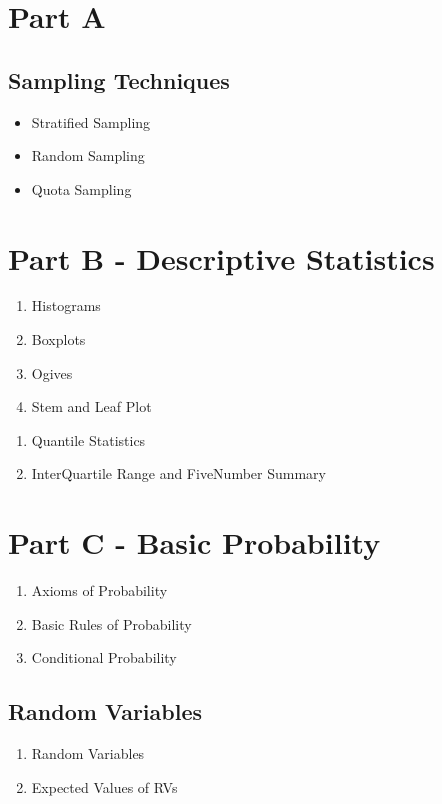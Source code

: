 \documentclass[]{article}
\title{}
\author{}
\begin{document}
\section{Part A}


\subsection{Sampling Techniques}
\begin{itemize}
\item Stratified Sampling
\item Random Sampling
\item Quota Sampling
\end{itemize}
\section{Part B - Descriptive Statistics}

\begin{enumerate}
\item Histograms
\item Boxplots
\item Ogives
\item Stem and Leaf Plot
\end{enumerate}

\begin{enumerate}
\item Quantile Statistics
\item InterQuartile Range and FiveNumber Summary
\end{enumerate}

\section{Part C - Basic Probability}

\begin{enumerate}
\item Axioms of Probability
\item Basic Rules of Probability
\item Conditional Probability
\end{enumerate}

\subsection{Random Variables}
\begin{enumerate}
\item Random Variables
\item Expected Values of RVs
\end{enumerate}
\end{document}
